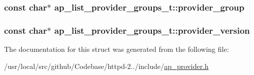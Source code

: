 \subsubsection[{\texorpdfstring{provider\+\_\+group}{provider_group}}]{\setlength{\rightskip}{0pt plus 5cm}const char$\ast$ ap\+\_\+list\+\_\+provider\+\_\+groups\+\_\+t\+::provider\+\_\+group}\hypertarget{structap__list__provider__groups__t_a2979467749225ed6e657db303eeaeb66}{}\label{structap__list__provider__groups__t_a2979467749225ed6e657db303eeaeb66}
\subsubsection[{\texorpdfstring{provider\+\_\+version}{provider_version}}]{\setlength{\rightskip}{0pt plus 5cm}const char$\ast$ ap\+\_\+list\+\_\+provider\+\_\+groups\+\_\+t\+::provider\+\_\+version}\hypertarget{structap__list__provider__groups__t_aa116a4ece1c406a370fadd0c94f84cf8}{}\label{structap__list__provider__groups__t_aa116a4ece1c406a370fadd0c94f84cf8}


The documentation for this struct was generated from the following file\+:\begin{DoxyCompactItemize}
\item 
/usr/local/src/github/\+Codebase/httpd-\/2../include/\hyperlink{ap__provider_8h}{ap\+\_\+provider.\+h}\end{DoxyCompactItemize}
